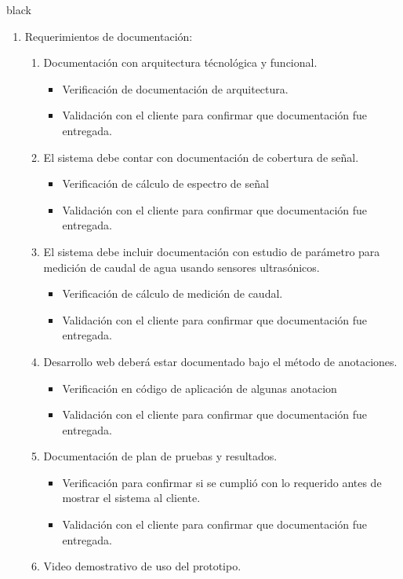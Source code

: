 \documentclass[
11pt, %
codirector, %
]{charter}
\begin{document}
\begin{consigna}{black}
\begin{enumerate}
\item Requerimientos de documentación:
	\begin{enumerate}
		\item Documentación con arquitectura técnológica y funcional.
			\begin{itemize}
				\item Verificación de documentación de arquitectura.
				\item Validación con el cliente para confirmar que documentación fue entregada.
			\end{itemize}
		\item El sistema debe contar con documentación de cobertura de señal. 
			\begin{itemize}
				\item Verificación de cálculo de espectro de señal 
				\item Validación con el cliente para confirmar que documentación fue entregada. 
			\end{itemize}
		\item El sistema debe incluir documentación con estudio de parámetro para medición de caudal de agua usando sensores ultrasónicos.
			\begin{itemize}
				\item Verificación de cálculo de medición de caudal. 
				\item Validación con el cliente para confirmar que documentación fue entregada. 
			\end{itemize}
		\item Desarrollo web deberá estar documentado bajo el método de anotaciones.
			\begin{itemize}
				\item Verificación en código de aplicación de algunas anotacion 
				\item Validación con el cliente para confirmar que documentación fue entregada. 
			\end{itemize}
		\item Documentación de plan de pruebas y resultados.
			\begin{itemize}
				\item Verificación para confirmar si se cumplió con lo requerido antes de mostrar el sistema al cliente. 
				\item Validación con el cliente para confirmar que documentación fue entregada. 
			\end{itemize}
		\item Video demostrativo de uso del prototipo.
			\begin{itemize}

\end{itemize}
\end{enumerate}
\end{enumerate}
\end{consigna}
\end{document}
